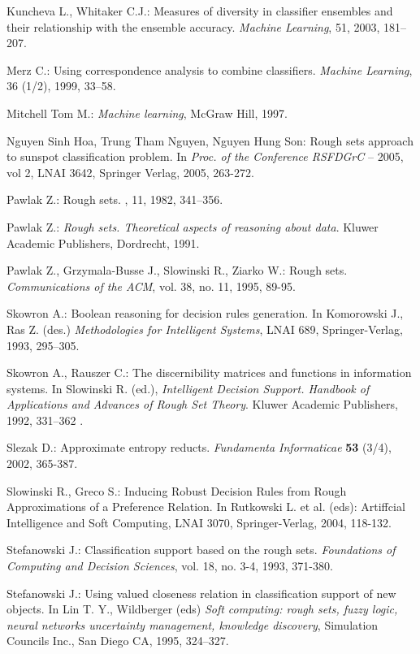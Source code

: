 \documentclass{llncs}
\begin{document}
\begin{thebibliography}{17}
 Kuncheva L., Whitaker C.J.: Measures of diversity in
classifier ensembles and their relationship with the ensemble accuracy. {\em
Machine Learning}, 51, 2003, 181--207.

 Merz C.: Using correspondence analysis to combine
classifiers. {\em Machine Learning}, 36 (1/2), 1999, 33--58.

 Mitchell Tom M.: {\em Machine learning}, McGraw Hill, 1997.

Nguyen Sinh Hoa, Trung Tham Nguyen, Nguyen Hung Son: Rough sets approach to
sunspot classification problem. In {\em Proc. of the Conference RSFDGrC} --
2005, vol 2, LNAI 3642, Springer Verlag, 2005, 263-272.

Pawlak Z.: Rough sets.
, 11,
1982, 341--356.

Pawlak Z.: {\em Rough  sets.  Theoretical  aspects  of reasoning about
data}. Kluwer Academic Publishers, Dordrecht, 1991.

 Pawlak Z., Grzymala-Busse J., Slowinski R., Ziarko W.:
Rough sets. {\em Communications of the ACM}, vol. 38, no. 11, 1995,   89-95.

 Skowron A.: Boolean reasoning for decision rules generation. In
Komorowski J., Ras Z. (des.) {\em Methodologies for Intelligent Systems},
LNAI 689,  Springer-Verlag, 1993,   295--305.

 Skowron A., Rauszer C.:
The discernibility matrices and functions in information systems. In
Slowinski R. (ed.), {\em Intelligent Decision Support.  Handbook of
Applications and Advances of Rough Set Theory}.  Kluwer Academic Publishers,
 1992, 331--362 .

Slezak D.: Approximate entropy reducts. {\em Fundamenta Informaticae}
\textbf{53} (3/4), 2002, 365-387.

Slowinski R., Greco S.: Inducing Robust Decision Rules from Rough
Approximations of a Preference Relation. In Rutkowski L. et al. (eds):
Artiffcial Intelligence and Soft Computing, LNAI 3070, Springer-Verlag,
2004, 118-132.

 Stefanowski J.:
Classification support based on the rough sets. {\em Foundations of
Computing and Decision Sciences}, vol. 18, no. 3-4, 1993, 371-380.


 Stefanowski J.: Using valued closeness relation in
classification support of new objects.  In Lin T. Y., Wildberger  (eds) {\em
Soft computing: rough sets, fuzzy logic, neural networks uncertainty
management, knowledge discovery}, Simulation Councils Inc., San Diego CA,
1995, 324--327.



\end{thebibliography}
\end{document}
